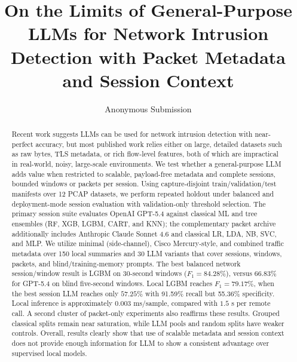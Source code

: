 \documentclass[letterpaper,twocolumn,10pt]{article}
\begin{document}
\title{On the Limits of General-Purpose LLMs for Network Intrusion Detection with Packet Metadata and Session Context}

\author{{\rm Anonymous Submission}}
\date{}

\maketitle

\begin{abstract}
Recent work suggests LLMs can be used for network intrusion detection with near-perfect accuracy, but most published work relies either on large, detailed datasets such as raw bytes, TLS metadata, or rich flow-level features, both of which are impractical in real-world, noisy, large-scale environments. We test whether a general-purpose LLM adds value when restricted to scalable, payload-free metadata and complete sessions, bounded windows or packets per session. Using capture-disjoint train/validation/test manifests over 12 PCAP datasets, we perform repeated holdout under balanced and deployment-mode session evaluation with validation-only threshold selection. The primary session suite evaluates OpenAI GPT-5.4 against classical ML and tree ensembles (RF, XGB, LGBM, CART, and KNN); the complementary packet archive additionally includes Anthropic Claude Sonnet 4.6 and classical LR, LDA, NB, SVC, and MLP. We utilize minimal (side-channel), Cisco Mercury-style, and combined traffic metadata over 150 local summaries and 30 LLM variants that cover sessions, windows, packets, and blind/training-memory prompts. The best balanced network session/window result is LGBM on 30-second windows ($F_1=84.28\%$), versus $66.83\%$ for GPT-5.4 on blind five-second windows. Local LGBM reaches $F_1=79.17\%$, when the best session LLM reaches only $57.25\%$ with 91.59\% recall but 55.36\% specificity. Local inference is approximately $0.003$ ms/sample, compared with $1.5$ s per remote call. A second cluster of packet-only experiments also reaffirms these results. Grouped classical splits remain near saturation, while LLM pools and random splits have weaker controls. Overall, results clearly show that use of scalable metadata and session context does not provide enough information for LLM to show a consistent advantage over supervised local models.
\end{abstract}

\end{document}
